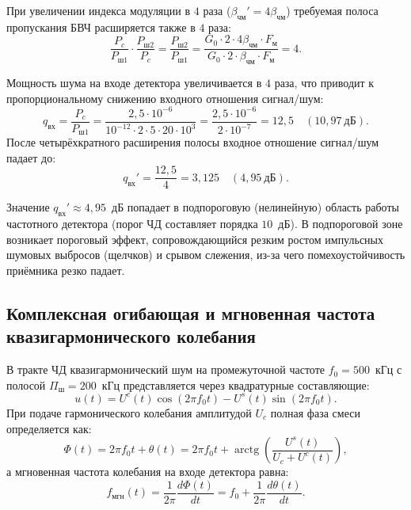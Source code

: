 При увеличении индекса модуляции в $4$ раза ($\beta_{\text{чм}}' = 4 \beta_{\text{чм}}$) требуемая полоса пропускания БВЧ расширяется также в $4$ раза:
\begin{equation}
    \frac{P_{c}}{P_{\text{ш}1}} \cdot \frac{P_{\text{ш}2}}{P_c} = \frac{P_{\text{ш}2}}{P_{\text{ш}1}} = \frac{G_0 \cdot 2 \cdot 4\beta_{\text{чм}} \cdot F_{\text{м}}}{G_0 \cdot 2 \cdot \beta_{\text{чм}} \cdot F_{\text{м}}} = 4.
\end{equation}

Мощность шума на входе детектора увеличивается в $4$ раза, что приводит к пропорциональному снижению входного отношения сигнал/шум:
\begin{equation}
    q_{\text{вх}} = \frac{P_c}{P_{\text{ш}1}} = \frac{2{,}5 \cdot 10^{-6}}{10^{-12} \cdot 2 \cdot 5 \cdot 20 \cdot 10^3} = \frac{2{,}5 \cdot 10^{-6}}{2 \cdot 10^{-7}} = 12{,}5 \quad (10{,}97~\text{дБ}).
\end{equation}
После четырёхкратного расширения полосы входное отношение сигнал/шум падает до:
\begin{equation}
    q_{\text{вх}}' = \frac{12{,}5}{4} = 3{,}125 \quad (4{,}95~\text{дБ}).
\end{equation}

Значение $q_{\text{вх}}' \approx 4{,}95$~дБ попадает в подпороговую (нелинейную) область работы частотного детектора (порог ЧД составляет порядка $10$~дБ). В подпороговой зоне возникает пороговый эффект, сопровождающийся резким ростом импульсных шумовых выбросов (щелчков) и срывом слежения, из-за чего помехоустойчивость приёмника резко падает.

\subsection{Комплексная огибающая и мгновенная частота квазигармонического колебания}

В тракте ЧД квазигармонический шум на промежуточной частоте $f_0 = 500$~кГц с полосой $\Pi_{\text{ш}} = 200$~кГц представляется через квадратурные составляющие:
\begin{equation}
    u(t) = U^c(t)\cos(2\pi f_0 t) - U^s(t)\sin(2\pi f_0 t).
\end{equation}
При подаче гармонического колебания амплитудой $U_c$ полная фаза смеси определяется как:
\begin{equation}
    \Phi(t) = 2\pi f_0 t + \theta(t) = 2\pi f_0 t + \operatorname{arctg}\left(\frac{U^s(t)}{U_c + U^c(t)}\right),
\end{equation}
а мгновенная частота колебания на входе детектора равна:
\begin{equation}
    f_{\text{мгн}}(t) = \frac{1}{2\pi}\frac{d\Phi(t)}{dt} = f_0 + \frac{1}{2\pi}\frac{d\theta(t)}{dt}.
\end{equation}


